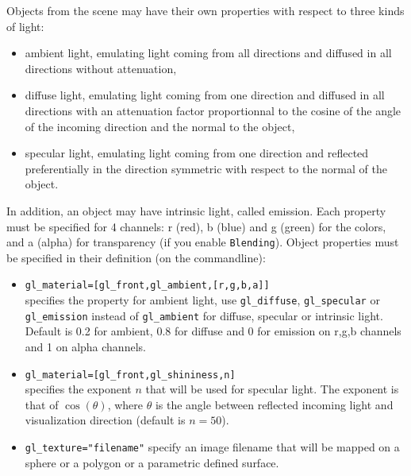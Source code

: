\documentclass{article}
\begin{document}
Objects from the scene may
have their own properties with respect to three kinds of light:
\begin{itemize}
\item ambient light,
emulating light coming from all directions and diffused
in all directions without attenuation, 
\item diffuse light,
emulating light coming from one direction and diffused in all directions
with an attenuation factor proportionnal to the cosine of the
angle of the incoming direction and the normal to the object,
\item specular light,
emulating light coming from one direction and reflected 
preferentially in the direction symmetric with respect to
the normal of the object.
\end{itemize}
In addition, an object may have intrinsic light, called emission.
Each property must be specified for 4 channels: r (red), b (blue)
and g (green) for the colors, and a (alpha) for transparency (if
you enable \verb|Blending|).
Object properties must be specified in their definition (on 
the commandline):
\begin{itemize}
\item \verb|gl_material=[gl_front,gl_ambient,[r,g,b,a]]|\\ 
specifies the property for ambient light, use 
\verb|gl_diffuse|, \verb|gl_specular| or \verb|gl_emission|
instead of \verb|gl_ambient| for diffuse, specular or intrinsic
light. Default is 0.2 for ambient, 0.8 for diffuse and 0 for emission
on r,g,b channels and 1 on alpha channels.
\item
\verb|gl_material=[gl_front,gl_shininess,n]|\\
specifies the exponent $n$ that will be used for specular light. The
exponent is that of $\cos(\theta)$, where $\theta$ is the angle
between reflected incoming light and visualization direction (default
is $n=50$).
\item
\verb|gl_texture="filename"| specify an image filename that
will be mapped on a sphere or a polygon or a parametric
defined surface.
\end{itemize} 
\end{document}

